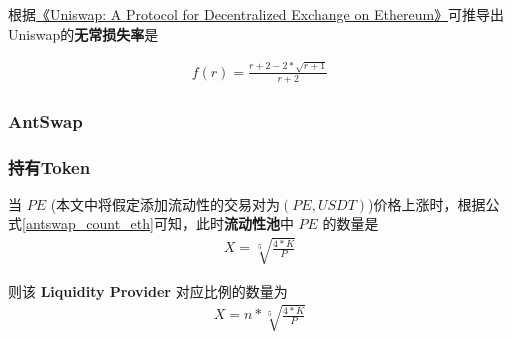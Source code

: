 \documentclass{article}
\begin{document}



根据\href{https://arxiv.org/abs/1801.03998}{《Uniswap: A Protocol for Decentralized Exchange on Ethereum》}可推导出Uniswap的\textbf{无常损失率}是

\begin{equation} \label{uniswap_impermanent_loss_rate}
\begin{split}
f(r) = \frac{r + 2 - 2 * \sqrt{r + 1}}{r + 2}
\end{split}
\end{equation}


\subsubsection{AntSwap}

\subsubsection*{持有Token}
当 $PE$ (本文中将假定添加流动性的交易对为$(PE, USDT)$)价格上涨时，根据公式\ref{antswap_count_eth}可知，此时\textbf{流动性池}中 $PE$ 的数量是
\begin{equation*}
\begin{split}
X = \sqrt[5]{\frac{4*K}{P}}
\end{split}
\end{equation*}

则该 \textbf{Liquidity Provider} 对应比例的数量为
\begin{equation*}
\begin{split}
X = n * \sqrt[5]{\frac{4*K}{P}}
\end{split}
\end{equation*}
\end{document}
